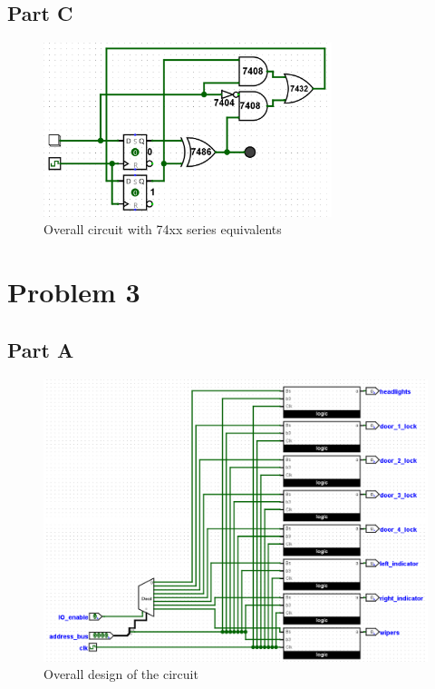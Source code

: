 \documentclass{article}
\begin{document}
\subsection*{Part C}
\begin{figure}[H]
    \centering
    \includegraphics[width=0.75\textwidth]{./images/problem2_circ.png}
    \caption{Overall circuit with 74xx series equivalents}
\end{figure}

\newpage
\section*{Problem 3}

\subsection*{Part A}
\begin{figure}[H]
    \centering
    \includegraphics[width=\textwidth]{./images/problem3_circ1.png}
    \caption{Overall design of the circuit}
\end{figure}
\end{document}
